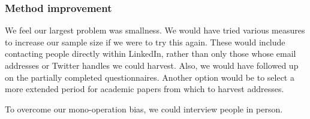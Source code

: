 \subsubsection{Method improvement}
We feel our largest problem was smallness.
We would have tried various measures to increase our sample size if we were to try this again.
These would include contacting people directly within LinkedIn, rather than only those whose email addresses or Twitter handles we could harvest.
Also, we would have followed up on the partially completed questionnaires.
Another option would be to select a more extended period for academic papers from which to harvest addresses.

To overcome our mono-operation bias, we could interview people in person.